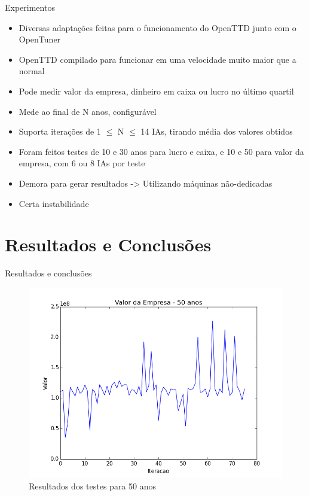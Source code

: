 \documentclass[10pt]{beamer}
\begin{document}
\begin{frame}{Experimentos}
	\begin{itemize}
	\item Diversas adaptações feitas para o funcionamento do OpenTTD junto com o OpenTuner \pause\\
	\item OpenTTD compilado para funcionar em uma velocidade muito maior que a normal\pause\\
	\item Pode medir valor da empresa, dinheiro em caixa ou lucro no último quartil\pause\\
	\item Mede ao final de N anos, configurável\pause\\
	\item Suporta iterações de 1 $\leq$ N $\leq$ 14 IAs, tirando média dos valores obtidos\pause\\
	\item Foram feitos testes de 10 e 30 anos para lucro e caixa, e 10 e 50 para valor da empresa, com 6 ou 8 IAs por teste\pause\\
	\item Demora para gerar resultados \pause -> Utilizando máquinas não-dedicadas\pause\\
	\item Certa instabilidade
	\end{itemize}
\end{frame}

\section{Resultados e Conclusões}

\begin{frame}{Resultados e conclusões}
	\begin{figure}
		\centering
		\includegraphics[width=1\linewidth]{value-50yrs}
		\caption{Resultados dos testes para 50 anos}
		\label{fig:value-50yrs}
	\end{figure}
	
\end{frame}
\end{document}

